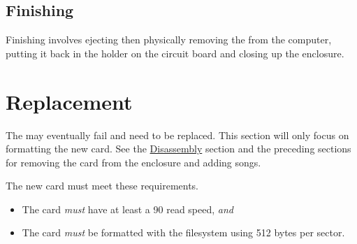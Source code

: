 \subsection{Finishing}

Finishing involves ejecting then physically removing the  from the
computer, putting it back in the holder on the circuit board and closing up the
enclosure.


\section{Replacement} \label{Replace SD Card}

The  may eventually fail and need to be replaced.  This section will
only focus on formatting the new card.  See the
\hyperref[Disassembly]{Disassembly} section and the preceding sections for
removing the card from the enclosure and adding songs.

\par\medskip

The new card must meet these requirements.

\begin{itemize}
  \item The card \textit{must} have at least a \num{90}  read
    speed, \textit{and}
  \item The card \textit{must} be formatted with the  filesystem
    using \num{512} bytes per sector.
\end{itemize}

